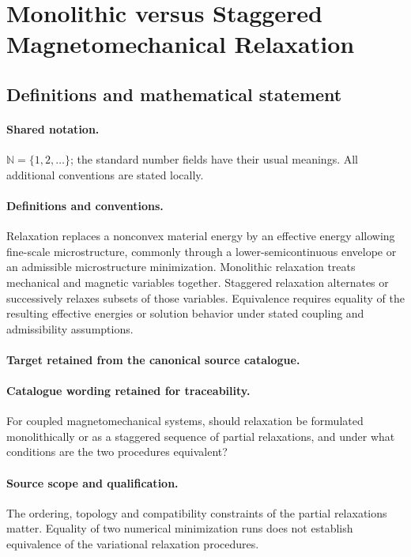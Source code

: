 \documentclass[11pt]{article}
\begin{document}
\section{Monolithic versus Staggered Magnetomechanical Relaxation}\label{statement}

\subsection{Definitions and mathematical statement}

\paragraph{Shared notation.}$\mathbb N=\{1,2,\ldots\}$; the standard number fields have their usual meanings. All additional conventions are stated locally.


\paragraph{Definitions and conventions.}
Relaxation replaces a nonconvex material energy by an effective energy allowing fine-scale microstructure, commonly through a lower-semicontinuous envelope or an admissible microstructure minimization. Monolithic relaxation treats mechanical and magnetic variables together. Staggered relaxation alternates or successively relaxes subsets of those variables. Equivalence requires equality of the resulting effective energies or solution behavior under stated coupling and admissibility assumptions.

\paragraph{Target retained from the canonical source catalogue.}
\paragraph{Catalogue wording retained for traceability.}
For coupled magnetomechanical systems, should relaxation be formulated monolithically or as a staggered sequence of partial relaxations, and under what conditions are the two procedures equivalent?

\paragraph{Source scope and qualification.}
The ordering, topology and compatibility constraints of the partial relaxations matter. Equality of two numerical minimization runs does not establish equivalence of the variational relaxation procedures.
\end{document}
